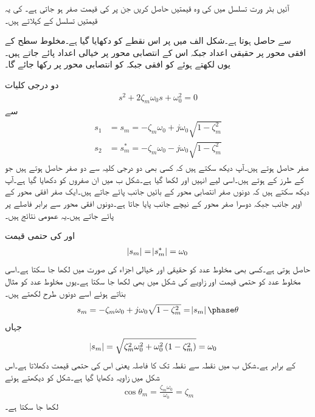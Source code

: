 آئیں بٹر ورت تسلسل میں  کی وہ قیمتیں حاصل کریں جن پر  کی قیمت صفر ہو جاتی  ہے۔ کی یہ قیمتیں تسلسل کے  کہلاتے ہیں۔

 سے  حاصل ہوتا ہے۔شکل  الف میں  پر اس نقطے کو دکھایا گیا ہے۔مخلوط سطح کے افقی محور پر حقیقی اعداد جبکہ اس کے انتصابی محور پر خیالی اعداد پائے جاتے ہیں۔یوں  لکھتے ہوئے  کو افقی جبکہ  کو انتصابی محور پر رکھا جائے گا۔

دو درجی کلیات
\begin{align}\label{مساوات_تعددی_ردعمل_دو_درجی_عمومی_جزو}
s^2+2 \zeta_m \omega_0 s +\omega_0^2=0
\end{align}
سے
\begin{gather}
\begin{aligned}
s_1&=s_m =-\zeta_m \omega_0 + j \omega_0 \sqrt{1-\zeta_m^2}\\
s_2&=s_m^* =-\zeta_m \omega_0 - j \omega_0 \sqrt{1-\zeta_m^2}
\end{aligned}
\end{gather}
صفر حاصل ہوتے ہیں۔آپ دیکھ سکتے ہیں کہ کسی بھی دو درجی کلیہ سے دو صفر حاصل ہوتے ہیں جو  کے طرز کے ہوتے ہیں۔اسی لیے انہیں  اور  لکھا گیا ہے۔شکل  ب میں ان صفروں کو دکھایا گیا ہے۔آپ دیکھ سکتے ہیں کہ دونوں صفر انتصابی محور کے بائیں جانب پائے جاتے ہیں۔ایک صفر افقی محور کے اوپر جانب جبکہ دوسرا صفر محور کے نیچے   جانب پایا جاتا ہے۔دونوں افقی محور سے برابر فاصلے پر پائے جاتے ہیں۔یہ  عمومی نتائج ہیں۔

 اور  کی حتمی قیمت
\begin{align}
\abs{s_m}=\abs{s_m^*}=\omega_0
\end{align}
حاصل ہوتی ہے۔کسی بھی مخلوط عدد کو حقیقی اور خیالی اجزاء کی صورت میں لکھا جا سکتا ہے۔اسی مخلوط عدد کو حتمی قیمت اور زاویے کی شکل میں بھی لکھا جا سکتا ہے۔یوں  مخلوط عدد کو مثال بناتے ہوئے اسے دونوں طرح لکھتے ہیں۔
\begin{align}
s_m=-\zeta_m \omega_0 +j \omega_0 \sqrt{1-\zeta_m^2}= \abs {s_m} \phase \theta
\end{align}
جہاں
\begin{align}\label{مساوات_تعددی_ردعمل_صفر_حتمی_فاصلہ}
\abs{s_m}&=\sqrt{\zeta_m^2 \omega_0^2 +\omega_0^2\left(1 -\zeta_m^2\right)}=\omega_0
\end{align}
کے برابر ہے۔شکل  ب میں نقطہ   سے  نقطہ  تک کا فاصلہ  یعنی اس کی حتمی قیمت دکھلاتا ہے۔اس شکل میں زاویہ  دکھایا گیا ہے۔شکل کو دیکھتے ہوئے
\begin{align}\label{مساوات_تعددی_ردعمل_دھیماپن_کا_حصول}
\cos \theta_m=\frac{\zeta_m \omega_0}{\omega_0}=\zeta_m
\end{align}
لکھا جا سکتا ہے۔

